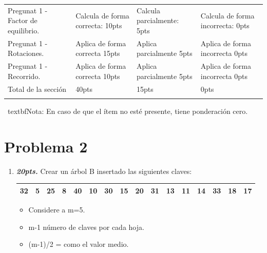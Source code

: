 \documentclass{exam}
\begin{document}
\begin{enumerate}
\begin{table}[H]
\begin{tabular}{
    !{\color{gray!50}\vrule}p{3.9cm}
    !{\color{gray!50}\vrule}p{3.6cm}
    !{\color{gray!50}\vrule}p{3.6cm}
    !{\color{gray!50}\vrule}p{3.6cm}
    !{\color{gray!50}\vrule}}
    Pregunat 1 - Factor de equilibrio. &
    Calcula de forma correcta: 10pts   &
    Calcula parcialmente: 5pts  &
    Calcula de forma incorrecta: 0pts \\  \hline

    Pregunat 1 - Rotaciones. &
    Aplica de forma correcta 15pts   &
    Aplica parcialmente 5pts &
    Aplica de forma incorrecta  0pts\\  \hline

    Pregunat 1 - Recorrido. &
    Aplica de forma correcta 10pts   &
    Aplica parcialmente 5pts &
    Aplica de forma incorrecta  0pts\\  \hline

    Total de la sección &  40pts & 15pts & 0pts\\  \hline
  \end{tabular}
  \label{tbl:1}
\end{table}

\vspace{-5mm} \ textbf{Nota:} En caso de que el ítem no esté presente,
tiene ponderación cero.



\newpage
\vspace{-7mm}
\section{\textbf{Problema 2}}
\noindent

\begin{questions}

  \begin{enumerate}
  \item \textbf{\emph{20pts.}} Crear un árbol B insertado las siguientes claves:

  \begin{table}[H]
  \centering
  \begin{tabular}{|l|l|l|l|l|l|l|l|l|l|l|l|l|l|l|l|}
  \hline
    32&	5	&25&	8&	40&	10&	30&	15&	20&	31&	13&	11&	14&	33&	18&	17\\
  \hline
  \end{tabular}
  \end{table}

\begin{itemize}
  \item Considere a m=5.
  \item m-1 número de claves por cada hoja.
  \item (m-1)/2 = como el valor medio.
\end{itemize}


\end{enumerate}
\end{questions}
\end{enumerate}
\end{document}
